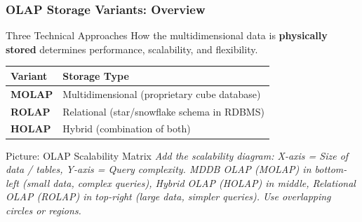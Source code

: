 \begin{frame}
  \frametitle{OLAP Storage Variants: Overview}

  \begin{block}{Three Technical Approaches}
    How the multidimensional data is \textbf{physically stored} determines
    performance, scalability, and flexibility.
  \end{block}

  \begin{tabularx}{\linewidth}{@{}l X@{}}
    \toprule
    \textbf{Variant} & \textbf{Storage Type} \\
    \midrule
    \textbf{MOLAP} & Multidimensional (proprietary cube database) \\
    \textbf{ROLAP} & Relational (star/snowflake schema in RDBMS) \\
    \textbf{HOLAP} & Hybrid (combination of both) \\
    \bottomrule
  \end{tabularx}

  \begin{alertblock}{Picture: OLAP Scalability Matrix}
    \textit{Add the scalability diagram:
    X-axis = Size of data / tables, Y-axis = Query complexity.
    MDDB OLAP (MOLAP) in bottom-left (small data, complex queries),
    Hybrid OLAP (HOLAP) in middle,
    Relational OLAP (ROLAP) in top-right (large data, simpler queries).
    Use overlapping circles or regions.}
  \end{alertblock}
\end{frame}

